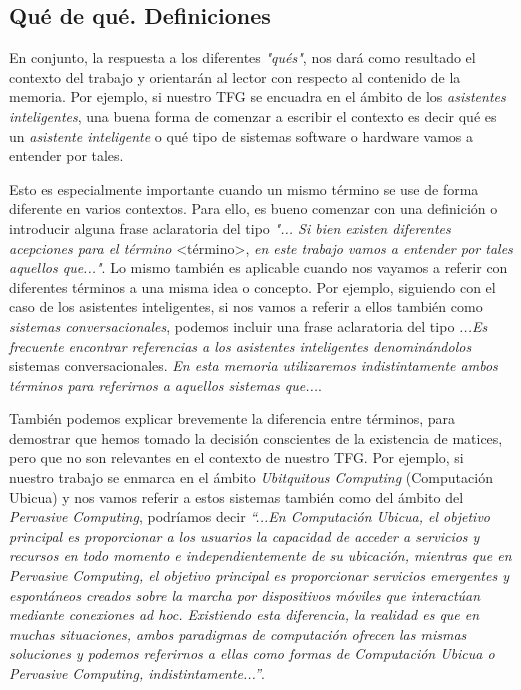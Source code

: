 \subsection{Qué de qué. Definiciones}

En conjunto, la respuesta a los diferentes \textit{"qués"}, nos dará como resultado el contexto del trabajo y orientarán al lector con respecto al contenido de la memoria. Por ejemplo, si nuestro TFG se encuadra en el ámbito de los \textit{asistentes inteligentes}, una buena forma de comenzar a escribir el contexto es decir qué es un \textit{asistente inteligente} o qué tipo de sistemas software o hardware vamos a entender por tales.

Esto es especialmente importante cuando un mismo término se use de forma diferente en varios contextos. Para ello, es bueno comenzar con una definición o introducir alguna frase aclaratoria del tipo \textit{"... Si bien existen diferentes acepciones para el término} \textless término\textgreater, \textit{en este trabajo vamos a entender por tales aquellos que..."}. Lo mismo también es aplicable cuando nos vayamos a referir con diferentes términos a una misma idea o concepto. Por ejemplo, siguiendo con el caso de los asistentes inteligentes, si nos vamos a referir a ellos también como \textit{sistemas conversacionales}, podemos incluir una frase aclaratoria del tipo \textit{...Es frecuente encontrar referencias a los asistentes inteligentes denominándolos } sistemas conversacionales. \textit{En esta memoria utilizaremos indistintamente ambos términos para referirnos a aquellos sistemas que...}.

También podemos explicar brevemente la diferencia entre términos, para demostrar que hemos tomado la decisión conscientes de la existencia de matices, pero que no son relevantes en el contexto de nuestro TFG. Por ejemplo, si nuestro trabajo se enmarca en el ámbito \textit{Ubitquitous Computing} (Computación Ubicua) y nos vamos referir a estos sistemas también como del ámbito del \textit{Pervasive Computing}, podríamos decir \textit{``...En Computación Ubicua, el objetivo principal es proporcionar a los usuarios la capacidad de acceder a servicios y recursos en todo momento e independientemente de su ubicación, mientras que en Pervasive Computing, el objetivo principal es proporcionar servicios emergentes y espontáneos creados sobre la marcha por dispositivos móviles que interactúan mediante conexiones ad hoc. Existiendo esta diferencia, la realidad es que en muchas situaciones, ambos paradigmas de computación ofrecen las mismas soluciones y podemos referirnos a ellas como formas de Computación Ubicua o Pervasive Computing, indistintamente...''}.

